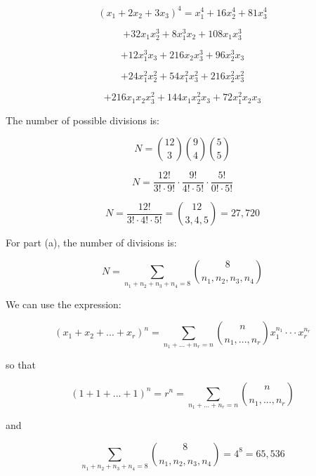 \documentclass[a4paper,12pt]{article}
\begin{document}
\[ (x_1 + 2x_2 + 3x_3)^4 = x_1^4 + 16x_2^4 + 81x_3^4 \]

\[ + 32 x_1 x_2^3 + 8x_1^3x_2 + 108x_1x_3^3 \]

\[ + 12x_1^3x_3 + 216x_2x_3^3 + 96x_2^3x_3\]

\[ + 24x_1^2x_2^2 + 54x_1^2x_3^2 + 216x_2^2 x_3^2 \]

\[ +216 x_1 x_2 x_3^2 + 144x_1 x_2^2 x_3 + 72x_1^2 x_2 x_3 \]

\pagebreak
{}

The number of possible divisions is:

\[ N = \binom{12}{3} \binom{9}{4} \binom{5}{5} \]

\[ N = \frac{12!}{3! \cdot 9!} \cdot \frac{9!}{4! \cdot 5!} \cdot \frac{5!}{0! \cdot 5!} \]

\[ N = \frac{12!}{3! \cdot 4! \cdot 5!} = \binom{12}{3,4,5} = 27,720 \]

\vspace{4mm}

For part (a), the number of divisions is:

\[ N =  \sum_{n_1 + n_2 + n_3 + n_4 = 8} \binom{8}{n_1, n_2, n_3, n_4} \]

We can use the expression:

\[ (x_1 + x_2 + ... + x_r)^n = \sum_{n_1 + ... + n_r = n}\binom{n}{n_1, ..., n_r} x_1^{n_1} \cdot \cdot \cdot x_r^{n_r} \]

\noindent
so that 

\[ (1 + 1 + ... + 1)^n = r^n = \sum_{n_1 + ... + n_r = n} \binom{n}{n_1, ..., n_r} \]

\noindent
and

\[ \sum_{n_1+n_2+n_3+n_4 = 8} \binom{8}{n_1, n_2, n_3, n_4} =  4^8 = 65,536 \]
\end{document}
